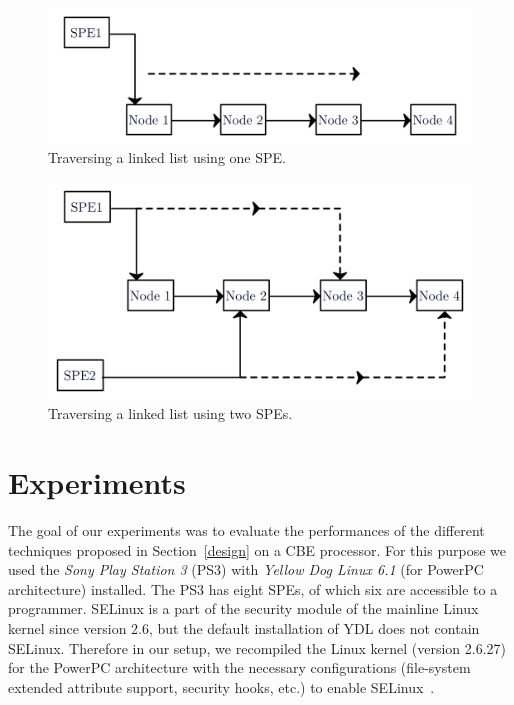 \documentclass[conference]{IEEEtran}
\begin{document}
\begin{figure}
\includegraphics[scale=0.45]{images/oneSPE.png}
\caption{Traversing a linked list using one SPE.}
\label{figOneSPE}
\vspace{0.05cm}
\end{figure}


\begin{figure}
\includegraphics[scale=0.45]{images/twoSPE.png}
\caption{Traversing a linked list using two SPEs.}
\label{figTwoSPE}
\vspace{0.05cm}
\end{figure}

\section{Experiments}\label{expr}

The goal of our experiments was to evaluate the performances of the
different techniques proposed in Section~\ref{design} on a CBE
processor.  For this purpose we used the \emph{Sony Play Station 3}
(PS3) with \emph{Yellow Dog Linux 6.1} (for PowerPC architecture)
installed.  The PS3 has eight SPEs, of which six are accessible to
a programmer.  SELinux is a part of the security module of the mainline
Linux kernel since version 2.6, but the default installation of
YDL does not contain SELinux.  Therefore in our setup, we recompiled the
Linux kernel (version 2.6.27) for the PowerPC architecture with the
necessary configurations (file-system extended attribute support,
security hooks, etc.) to enable SELinux~\cite{report}.
\end{document}
